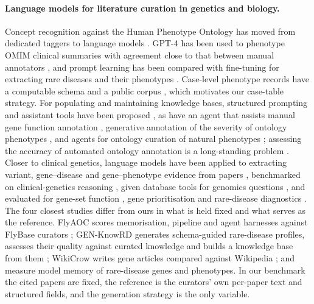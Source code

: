 \documentclass{article} %
\begin{document}
\paragraph{Language models for literature curation in genetics and biology.}
Concept recognition against the Human Phenotype Ontology has moved from dedicated taggers \citep{luo2021phenotagger,groza2024fasthpocr} to language models \citep{groza2024evaluation,yang2024enhancing,garcia2025improving}. GPT-4 has been used to phenotype OMIM clinical summaries with agreement close to that between manual annotators \citep{Hier2024HighthroughputPhenotyping}, and prompt learning has been compared with fine-tuning for extracting rare diseases and their phenotypes \citep{Shyr2024IdentifyingExtracting}. Case-level phenotype records have a computable schema and a public corpus \citep{jacobsen2022ga4gh,danis2025corpus}, which motivates our case-table strategy. For populating and maintaining knowledge bases, structured prompting and assistant tools have been proposed \citep{caufield2024structured,caufield2024curategpt,toro2024dynamic,niyonkuru2025leveraging}, as have an agent that assists manual gene function annotation \citep{Li2025GenewhispererEnhancing}, generative annotation of the severity of ontology phenotypes \citep{Murphy2024HarnessingGenerative}, and agents for ontology curation of natural phenotypes \citep{balhoff2026frontier}; assessing the accuracy of automated ontology annotation is a long-standing problem \citep{Verspoor2006CategorizationApproach}. Closer to clinical genetics, language models have been applied to extracting variant, gene--disease and gene--phenotype evidence from papers \citep{li2025autopm3,furlan2025eagleai,wang2026pubmind,yin2026benchmarking}, benchmarked on clinical-genetics reasoning \citep{queen2025cgbench}, given database tools for genomics questions \citep{Jin2023GenegptAugmenting}, and evaluated for gene-set function \citep{hu2025evaluation}, gene prioritisation \citep{Kim2024AssessingUtility} and rare-disease diagnostics \citep{twede2026evidence}. The four closest studies differ from ours in what is held fixed and what serves as the reference. FlyAOC scores memorisation, pipeline and agent harnesses against FlyBase curators \citep{zhang2026flyaoc}; GEN-KnowRD generates schema-guided rare-disease profiles, assesses their quality against curated knowledge and builds a knowledge base from them \citep{yan2026genknowrd}; WikiCrow writes gene articles compared against Wikipedia \citep{skarlinski2024language}; and \citet{groza2026systematic} measure model memory of rare-disease genes and phenotypes. In our benchmark the cited papers are fixed, the reference is the curators' own per-paper text and structured fields, and the generation strategy is the only variable.
\end{document}
